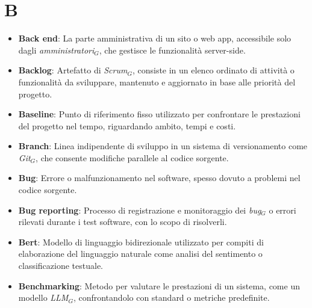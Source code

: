 \section{B}
\begin{itemize}
    \item \textbf{Back end}: La parte amministrativa di un sito o web app, accessibile solo dagli \textit{amministratori}$_G$, che gestisce le funzionalità server-side.
    \item \textbf{Backlog}: Artefatto di \textit{Scrum}$_G$, consiste in un elenco ordinato di attività o funzionalità da sviluppare, mantenuto e aggiornato in base alle priorità del progetto.
    \item \textbf{Baseline}: Punto di riferimento fisso utilizzato per confrontare le prestazioni del progetto nel tempo, riguardando ambito, tempi e costi.
    \item \textbf{Branch}: Linea indipendente di sviluppo in un sistema di versionamento come \textit{Git}$_G$, che consente modifiche parallele al codice sorgente.
    \item \textbf{Bug}: Errore o malfunzionamento nel software, spesso dovuto a problemi nel codice sorgente.
    \item \textbf{Bug reporting}: Processo di registrazione e monitoraggio dei \textit{bug}$_G$ o errori rilevati durante i test software, con lo scopo di risolverli.
    \item \textbf{Bert}: Modello di linguaggio bidirezionale utilizzato per compiti di elaborazione del linguaggio naturale come analisi del sentimento o classificazione testuale.
    \item \textbf{Benchmarking}: Metodo per valutare le prestazioni di un sistema, come un modello \textit{LLM}$_G$, confrontandolo con standard o metriche predefinite.
\end{itemize}
